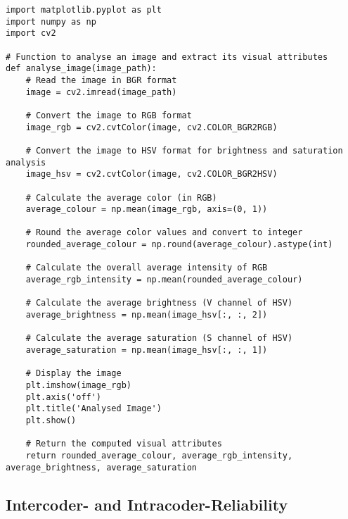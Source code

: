 \begin{lstlisting}
import matplotlib.pyplot as plt
import numpy as np
import cv2

# Function to analyse an image and extract its visual attributes
def analyse_image(image_path):
    # Read the image in BGR format
    image = cv2.imread(image_path)
    
    # Convert the image to RGB format
    image_rgb = cv2.cvtColor(image, cv2.COLOR_BGR2RGB)
    
    # Convert the image to HSV format for brightness and saturation analysis
    image_hsv = cv2.cvtColor(image, cv2.COLOR_BGR2HSV)
    
    # Calculate the average color (in RGB)
    average_colour = np.mean(image_rgb, axis=(0, 1))
    
    # Round the average color values and convert to integer
    rounded_average_colour = np.round(average_colour).astype(int)

    # Calculate the overall average intensity of RGB
    average_rgb_intensity = np.mean(rounded_average_colour)

    # Calculate the average brightness (V channel of HSV)
    average_brightness = np.mean(image_hsv[:, :, 2])
    
    # Calculate the average saturation (S channel of HSV)
    average_saturation = np.mean(image_hsv[:, :, 1])
    
    # Display the image
    plt.imshow(image_rgb)
    plt.axis('off')
    plt.title('Analysed Image')
    plt.show()
        
    # Return the computed visual attributes
    return rounded_average_colour, average_rgb_intensity, average_brightness, average_saturation
\end{lstlisting}

\subsection{Intercoder- and Intracoder-Reliability}